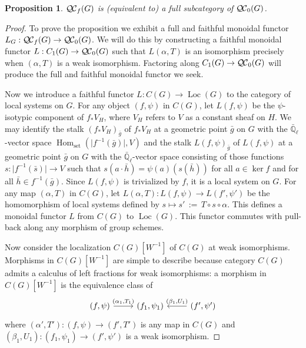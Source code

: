 \documentclass[11pt]{amsart}
\theoremstyle{plain}
\newtheorem{proposition}[theorem]{Proposition}
\theoremstyle{definition}
\theoremstyle{remark}
\newcommand{\EE}{\mathbb{\bar Q}_\ell}
\DeclareMathOperator{\Hom}{Hom}
\newcommand{\abs}[1]{{\vert #1 \vert}}
\newcommand{\ceq}{{\, :=\, }}
\newcommand{\QC}{{\mathcal{Q\hskip-0.8pt C}}}
\newcommand{\QCb}{{\QC_0}}
\newcommand{\QCf}{{\QC_f}}
\newcommand{\Loc}{{\operatorname{Loc}}}
\begin{document}
\begin{proposition}\label{prop:bounded}
 $\QCf(G)$ is (equivalent to) a full subcategory of $\QCb(G)$.
\end{proposition}

\begin{proof}
 To prove the proposition we exhibit a full and faithful monoidal functor $L_G : \QCf(G) \to \QCb(G)$.
 We will do this by constructing a faithful monoidal functor $L : C_1(G) \to \QCb(G)$ 
 such that $L(\alpha,T)$ is an isomorphism precisely when $(\alpha,T)$ is a weak isomorphism. 
 Factoring along $C_1(G) \to \QCb(G)$ will produce the full and faithful monoidal functor we seek.

 Now we introduce a faithful functor $L : C(G) \to \Loc(G)$ to the category of local systems on $G$.
 For any object $(f,\psi)$ in $C(G)$, let $L(f,\psi)$ be the $\psi$-isotypic component of $f_* V_H$, 
 where $V_H$ refers to $V$ as a constant sheaf on $H$. 
 We may identify the stalk $(f_* V_H)_{\bar g}$ of $f_* V_H$ at a geometric point ${\bar g}$ on $G$ 
 with the $\EE$-vector space $\Hom_\text{set}(\abs{f^{-1}({\bar g})},V)$ 
 and the stalk $L(f,\psi)_{\bar g}$ of $L(f,\psi)$ at a geometric point ${\bar g}$ on $G$ 
 with the $\EE$-vector space consisting of those functions $s: \abs{f^{-1}({\bar s})} \to V$ such that 
 $s(a\cdot {\bar h}) = \psi(a)(s({\bar h}))$ for all $a\in \ker f$ and for all ${\bar h} \in f^{-1}({\bar g})$.
 Since $L(f,\psi)$ is trivialized by $f$, it is a local system on $G$.
 For any map $(\alpha,T)$ in $C(G)$, let $L(\alpha,T) : L(f,\psi) \to L(f',\psi')$ be the homomorphism of local systems defined 
 by $s \mapsto s' \ceq T\circ s\circ \alpha$. 
 This defines a monoidal functor $L$ from $C(G)$ to $\Loc(G)$. 
 This functor commutes with pull-back along any morphism of group schemes.
  
 Now consider the localization $C(G)[W^{-1}]$ of $C(G)$ at weak isomorphisms.
 Morphisms in $C(G)[W^{-1}]$ are simple to describe because category $C(G)$ 
 admits a calculus of left fractions
 for weak isomorphisms:
 a morphism in $C(G)[W^{-1}]$ is the equivalence class of 
  \begin{equation}\label{eq:morGCf}
   \begin{tikzcd}
   (f,\psi) \arrow{r}{(\alpha_1,T_1)} & (f_1,\psi_1) & \arrow[swap]{l}{(\beta_1,U_1)} (f',\psi')
   \end{tikzcd}
  \end{equation}
 where $(\alpha',T') : (f,\psi) \to (f',T')$ is any map in $C(G)$ 
 and $(\beta_1,U_1) : (f_1,\psi_1) \to (f',\psi')$ is a weak isomorphism.


\end{proof}
\end{document}

